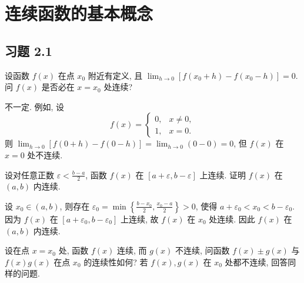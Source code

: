 \chapter{连续函数的基本概念}
\section{习题 2.1}

\begin{exercise}[2.1.1]
    设函数 $f(x)$ 在点 $x_0$ 附近有定义, 且 $\lim_{h \to 0} [f(x_0+h)-f(x_0-h)]=0$. 问 $f(x)$ 是否必在 $x=x_0$ 处连续?
\end{exercise}

\begin{solution}
    不一定. 例如, 设
    $$ f(x) = \begin{cases} 0, & x \ne 0, \\ 1, & x=0. \end{cases} $$
    则 $\lim_{h \to 0} [f(0+h)-f(0-h)] = \lim_{h \to 0} (0-0)=0$, 但 $f(x)$ 在 $x=0$ 处不连续.
\end{solution}

\begin{exercise}[2.1.2]
    设对任意正数 $\varepsilon < \frac{b-a}{2}$, 函数 $f(x)$ 在 $[a+\varepsilon, b-\varepsilon]$ 上连续. 证明 $f(x)$ 在 $(a,b)$ 内连续.
\end{exercise}

\begin{solution}
    设 $x_0 \in (a,b)$, 则存在 $\varepsilon_0 = \min\left\{\frac{b-x_0}{2}, \frac{x_0-a}{2}\right\}> 0$, 使得 $a+\varepsilon_0 < x_0 < b-\varepsilon_0$. 因为 $f(x)$ 在 $[a+\varepsilon_0, b-\varepsilon_0]$ 上连续, 故 $f(x)$ 在 $x_0$ 处连续. 因此 $f(x)$ 在 $(a,b)$ 内连续.
\end{solution}

\begin{exercise}[2.1.3]
    设在点 $x=x_0$ 处, 函数 $f(x)$ 连续, 而 $g(x)$ 不连续, 问函数 $f(x) \pm g(x)$ 与 $f(x)g(x)$ 在点 $x_0$ 的连续性如何? 若 $f(x), g(x)$ 在 $x_0$ 处都不连续, 回答同样的问题.
\end{exercise}

